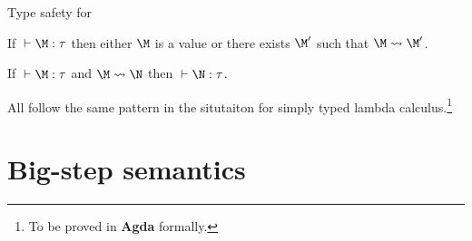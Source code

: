 \begin{frame}{Type safety for \PCF}
  \begin{theorem}
    If ${} \vdash \M : \tau$ then either $\M$ is a value or
    there exists $\M'$ such that $\M \leadsto \M'$. 
  \end{theorem}
  \begin{theorem}
    If ${}\vdash \M : \tau$ and $\M \leadsto \N$ then ${}\vdash \N : \tau$. 
  \end{theorem}
  All follow the same pattern in the situtaiton for simply typed lambda
  calculus.\footnote{
    To be proved in \textbf{Agda} formally.
  }
\end{frame}

\section{Big-step semantics}

